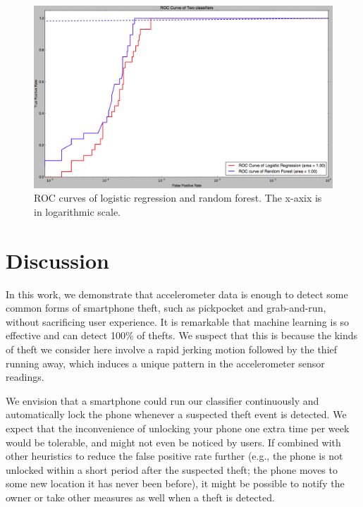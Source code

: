 \documentclass{soups}
\begin{document}
\begin{figure}[t]
\begin{center}
\includegraphics[width=1.0\columnwidth]{roc_curves_log_line.png}
\end{center}
\caption{ROC curves of logistic regression and random forest. The x-axix is in logarithmic scale.}
\label{fig:roc}
\end{figure}



\section{Discussion}
In this work, we demonstrate that accelerometer data is enough to detect some common forms of smartphone theft, such as pickpocket and grab-and-run, without sacrificing user experience. 
It is remarkable that machine learning is so effective and can detect 100\% of thefts.
We suspect that this is because the kinds of theft we consider here involve a rapid jerking motion followed by the thief running away, which induces a unique pattern in the accelerometer sensor readings.

We envision that a smartphone could run our classifier continuously and automatically lock the phone whenever a suspected theft event is detected.
We expect that the inconvenience of unlocking your phone one extra time per week would be tolerable, and might not even be noticed by users.
If combined with other heuristics to reduce the false positive rate further (e.g., the phone is not unlocked within a short period after the suspected theft; the phone moves to some new location it has never been before), it might be possible to notify the owner or take other measures as well when a theft is detected.
\end{document}

